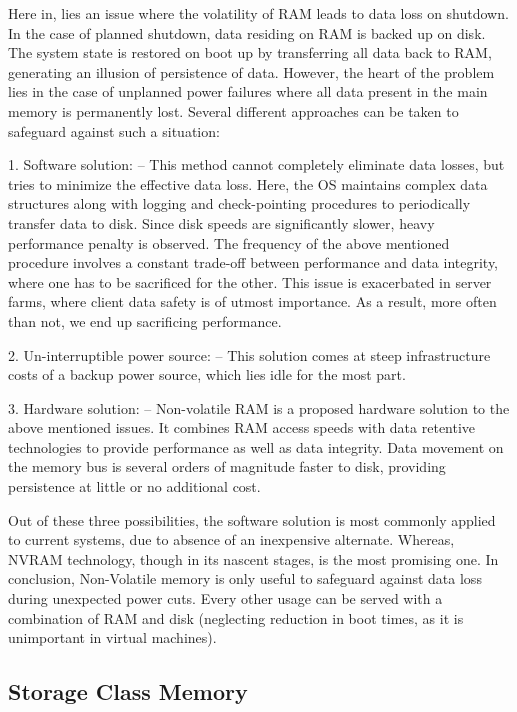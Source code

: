 Here in, lies an issue where the volatility of RAM leads to data loss on shutdown. In the case of planned shutdown, data residing on RAM is backed up on disk. The system state is restored on boot up by transferring all data back to RAM, generating an illusion of persistence of data. However, the heart of the problem lies in the case of unplanned power failures where all data present in the main memory is permanently lost. Several different approaches can be taken to safeguard against such a situation:

1. Software solution: -- This method cannot completely eliminate data losses, but tries to minimize the effective data loss. Here, the OS maintains complex data structures along with logging and check-pointing procedures to periodically transfer data to disk. Since disk speeds are significantly slower, heavy performance penalty is observed. The frequency of the above mentioned procedure involves a constant trade-off between performance and data integrity, where one has to be sacrificed for the other. This issue is exacerbated in server farms, where client data safety is of utmost importance. As a result, more often than not, we end up sacrificing performance.

2. Un-interruptible power source: -- This solution comes at steep infrastructure costs of a backup power source, which lies idle for the most part.

3. Hardware solution: -- Non-volatile RAM is a proposed hardware solution to the above mentioned issues. It combines RAM access speeds with data retentive technologies to provide performance as well as data integrity. Data movement on the memory bus is several orders of magnitude faster to disk, providing persistence at little or no additional cost.

Out of these three possibilities, the software solution is most commonly applied to current systems, due to absence of an inexpensive alternate. Whereas, NVRAM technology, though in its nascent stages, is the most promising one. In conclusion, Non-Volatile memory is only useful to safeguard against data loss during unexpected power cuts. Every other usage can be served with a combination of RAM and disk (neglecting reduction in boot times, as it is unimportant in virtual machines). 

\subsection{Storage Class Memory}

